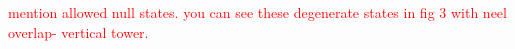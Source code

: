 \documentclass{article}
\begin{document}

\textcolor{red}{mention allowed null states. you can see these degenerate states in fig 3 with neel overlap- vertical tower.}
\end{document}
